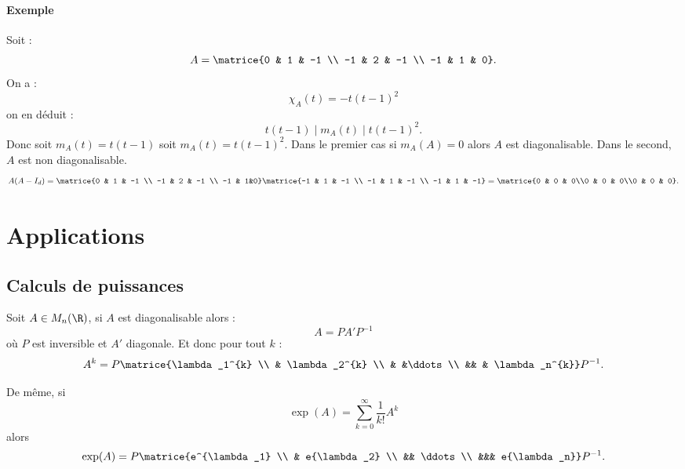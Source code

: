 \paragraph{Exemple}Soit : \[ A = \matrice{0 & 1 & -1 \\ -1 & 2 & -1 \\ -1 & 1 & 0}.\]On a : \[ \chi_A(t) = -t(t-1)^{2}\] on en déduit : \[ t(t-1) \mid m_A(t) \mid t(t-1)^{2}.\] Donc soit $m_A(t) = t(t-1)$ soit $m_A(t) = t(t-1)^{2}$. Dans le premier cas si $m_A(A) = 0$ alors $A$ est diagonalisable. Dans le second, $A$ est non diagonalisable.
\[ A(A-I_d) = \matrice{0 & 1 & -1 \\ -1 & 2 & -1 \\ -1 & 1&0}\matrice{-1 & 1 & -1 \\ -1 & 1 & -1 \\ -1 & 1 & -1} = \matrice{0 & 0 & 0\\0 & 0 & 0\\0 & 0 & 0}.\]

\section{Applications}
\subsection{Calculs de puissances}
Soit $A\in M_n(\R)$, si $A$ est diagonalisable alors : \[ A = P A'P^{-1}\]où $P$ est inversible et $A'$ diagonale. Et donc pour tout $k$ : \[ A^{k} = P \matrice{\lambda_1^{k} \\ & \lambda_2^{k} \\
 & &\ddots \\ && & \lambda_n^{k}}P^{-1}.\]

De même, si \[ \exp(A) = \sum_{k=0}^{\infty} \frac{1}{k!}A^{k}\] alors \[ \exp(A) = P \matrice{e^{\lambda_1} \\ & e{\lambda_2} \\ && \ddots \\ &&& e{\lambda_n}}P^{-1}.\]

